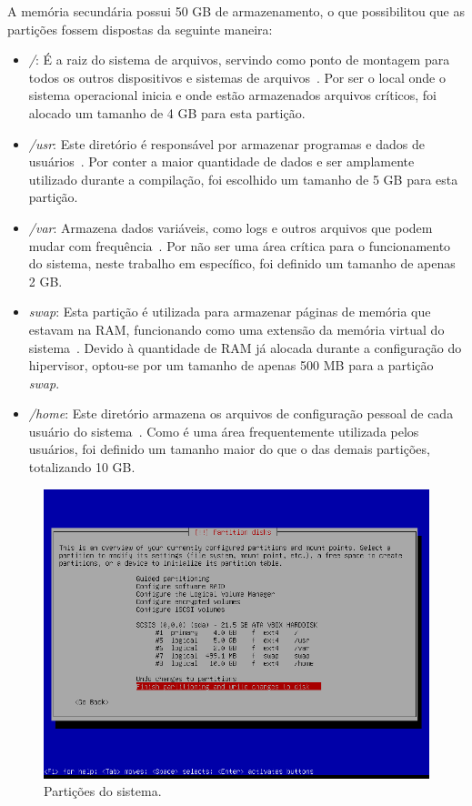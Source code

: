 \documentclass[
	12pt,				%
	oneside,   	        %
	a4paper,			%
	english,			%
	french,				%
	spanish,			%
	brazil,				%
	]{pacotes/abntex2}
\begin{document}
A memória secundária possui 50 GB de armazenamento, o que possibilitou que as partições fossem dispostas da seguinte maneira:

\begin{itemize}
    \item \textit{/}: É a raiz do sistema de arquivos, servindo como ponto de montagem para todos os outros dispositivos e sistemas de arquivos~\cite{tldpRootDir}. Por ser o local onde o sistema operacional inicia e onde estão armazenados arquivos críticos, foi alocado um tamanho de 4 GB para esta partição.
    
    \item \textit{/usr}: Este diretório é responsável por armazenar programas e dados de usuários~\cite{tldpUsrDir}. Por conter a maior quantidade de dados e ser amplamente utilizado durante a compilação, foi escolhido um tamanho de 5 GB para esta partição.
    
    \item \textit{/var}: Armazena dados variáveis, como logs e outros arquivos que podem mudar com frequência~\cite{tldpVarDir}. Por não ser uma área crítica para o funcionamento do sistema, neste trabalho em específico, foi definido um tamanho de apenas 2 GB.
    
    \item \textit{swap}: Esta partição é utilizada para armazenar páginas de memória que estavam na RAM, funcionando como uma extensão da memória virtual do sistema~\cite{archSwap}. Devido à quantidade de RAM já alocada durante a configuração do hipervisor, optou-se por um tamanho de apenas 500 MB para a partição \textit{swap}.
    
    \item \textit{/home}: Este diretório armazena os arquivos de configuração pessoal de cada usuário do sistema~\cite{tldpHomeDir}. Como é uma área frequentemente utilizada pelos usuários, foi definido um tamanho maior do que o das demais partições, totalizando 10 GB.
\end{itemize}

\begin{figure}[H]
  \centering
  \includegraphics[scale=0.7]{figuras/partition.png}
  \caption{Partições do sistema.}
  \label{fig:partition}
\end{figure}
\end{document}
